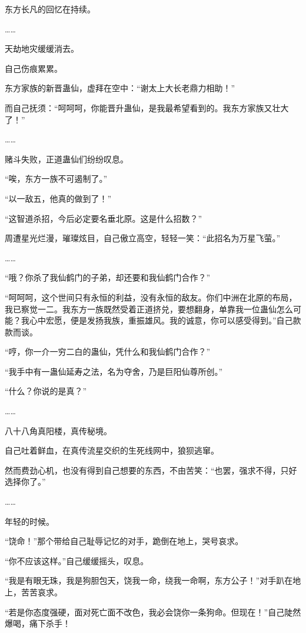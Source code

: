 
\begin{this_body}

东方长凡的回忆在持续。

……

天劫地灾缓缓消去。

自己伤痕累累。

东方家族的新晋蛊仙，虚拜在空中：“谢太上大长老鼎力相助！”

而自己抚须：“呵呵呵，你能晋升蛊仙，是我最希望看到的。我东方家族又壮大了！”

……

赌斗失败，正道蛊仙们纷纷叹息。

“唉，东方一族不可遏制了。”

“以一敌五，他真的做到了！”

“这智道杀招，今后必定要名垂北原。这是什么招数？”

周遭星光烂漫，璀璨炫目，自己傲立高空，轻轻一笑：“此招名为万星飞萤。”

……

“哦？你杀了我仙鹤门的子弟，却还要和我仙鹤门合作？”

“呵呵呵，这个世间只有永恒的利益，没有永恒的敌友。你们中洲在北原的布局，我已察觉一二。我东方一族既然受着正道挤兑，要想翻身，单靠我一位蛊仙怎么可能？我心中宏愿，便是发扬我族，重振雄风。我的诚意，你可以感受得到。”自己款款而谈。

“哼，你一介一穷二白的蛊仙，凭什么和我仙鹤门合作？”

“我手中有一蛊仙延寿之法，名为夺舍，乃是巨阳仙尊所创。”

“什么？你说的是真？”

……

八十八角真阳楼，真传秘境。

自己吐着鲜血，在真传流星交织的生死线网中，狼狈逃窜。

然而费劲心机，也没有得到自己想要的东西，不由苦笑：“也罢，强求不得，只好选择你了。”

……

年轻的时候。

“饶命！”那个带给自己耻辱记忆的对手，跪倒在地上，哭号哀求。

“你不应该这样。”自己缓缓摇头，叹息。

“我是有眼无珠，我是狗胆包天，饶我一命，绕我一命啊，东方公子！”对手趴在地上，苦苦哀求。

“若是你态度强硬，面对死亡面不改色，我必会饶你一条狗命。但现在！”自己陡然爆喝，痛下杀手！


\end{this_body}
